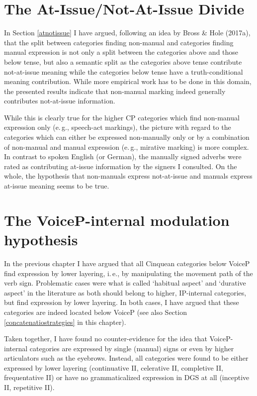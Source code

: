 \section{The At-Issue/Not-At-Issue Divide}
In Section \ref{atnotissue} I have argued, following an idea by Bross \& Hole (2017a), that the split between categories finding non-manual and categories finding manual expression is not only a split between the categories above and those below tense, but also a semantic split as the categories above tense contribute not-at-issue meaning while the categories below tense have a truth-conditional meaning contribution. While more empirical work has to be done in this domain, the presented results indicate that non-manual marking indeed generally contributes not-at-issue information. 

While this is clearly true for the higher CP categories which find non-manual expression only (e.\,g., speech-act markings), the picture with regard to the categories which can either be expressed non-manually only or by a combination of non-manual and manual expression (e.\,g., mirative marking) is more complex. In contrast to spoken English (or German), the manually signed adverbs were rated as contributing at-issue information by the signers I consulted. On the whole, the hypothesis that non-manuals express not-at-issue and manuals express at-issue meaning seems to be true. %





\section{The VoiceP-internal modulation hypothesis}
In the previous chapter I have argued that all Cinquean categories below VoiceP find expression by lower layering, i.\,e., by manipulating the movement path of the verb sign. Problematic cases were what is called `habitual aspect' and `durative aspect' in the literature as both should belong to higher, IP-internal categories, but find expression by lower layering. In both cases, I have argued that these categories are indeed located below VoiceP (see also Section \ref{concatenatiostrategies} in this chapter). 


Taken together, I have found no counter-evidence for the idea that VoiceP-internal categories are expressed by single (manual) signs or even by higher articulators such as the eyebrows. Instead, all categories were found to be either expressed by lower layering (continuative II, celerative II, completive II, frequentative II) or have no grammaticalized expression in DGS at all (inceptive II, repetitive II). 


